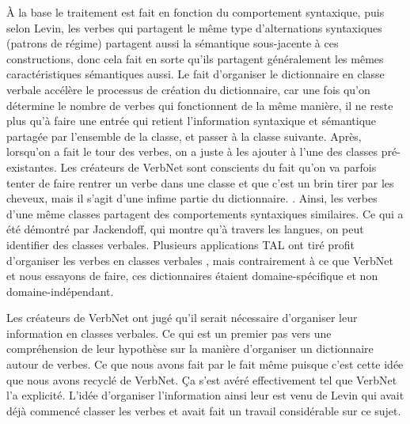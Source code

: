À la base le traitement est fait en fonction du comportement syntaxique, puis selon Levin, les verbes qui partagent le même type d'alternations syntaxiques (patrons de régime) partagent aussi la sémantique sous-jacente à ces constructions, donc cela fait en sorte qu'ils partagent généralement les mêmes caractéristiques sémantiques aussi. Le fait d'organiser le dictionnaire en classe verbale accélère le processus de création du dictionnaire, car une fois qu'on détermine le nombre de verbes qui fonctionnent de la même manière, il ne reste plus qu'à faire une entrée qui retient l'information syntaxique et sémantique partagée par l'ensemble de la classe, et passer à la classe suivante. Après, lorsqu'on a fait le tour des verbes, on a juste à les ajouter à l'une des classes pré-existantes. Les créateurs de VerbNet sont conscients du fait qu'on va parfois tenter de faire rentrer un verbe dans une classe et que c'est un brin tirer par les cheveux, mais il s'agit d'une infime partie du dictionnaire. \citep{SchulerVerbnetBroadcoverageComprehensive2005}. Ainsi, les verbes d'une même classes partagent des comportements syntaxiques similaires. Ce qui a été démontré par Jackendoff, qui montre qu'à travers les langues, on peut identifier des classes verbales. Plusieurs applications TAL ont tiré profit d'organiser les verbes en classes verbales \citep{SchulerVerbnetBroadcoverageComprehensive2005}, mais contrairement à ce que VerbNet et nous essayons de faire, ces dictionnaires étaient domaine-spécifique et non domaine-indépendant.

Les créateurs de VerbNet ont jugé qu'il serait nécessaire d'organiser leur information en classes verbales. Ce qui est un premier pas vers une compréhension de leur hypothèse sur la manière d'organiser un dictionnaire autour de verbes. Ce que nous avons fait par le fait même puisque c'est cette idée que nous avons recyclé de VerbNet. Ça s'est avéré effectivement tel que VerbNet l'a explicité. L'idée d'organiser l'information ainsi leur est venu de Levin qui avait déjà commencé classer les verbes et avait fait un travail considérable sur ce sujet. 


